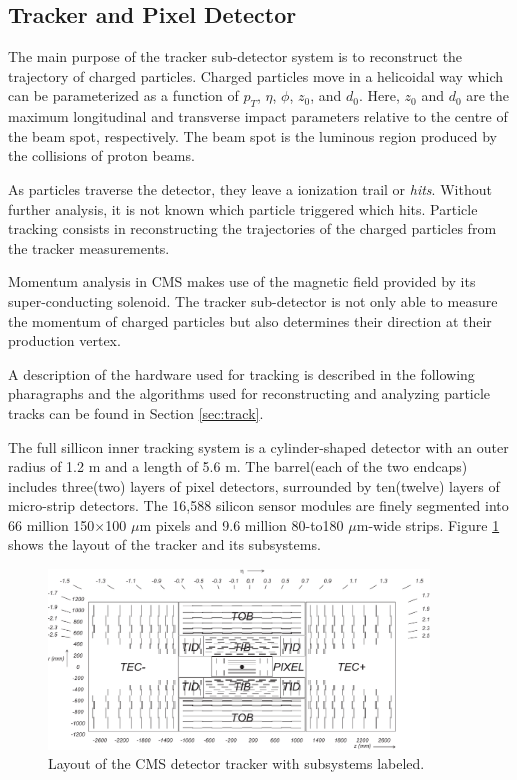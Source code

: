  \subsection{Tracker and Pixel Detector}
The main purpose of the tracker sub-detector system is to reconstruct the trajectory of charged particles. Charged particles move in a helicoidal way which can be parameterized as a function of $p_{T}$, $\eta$, $\phi$, $z_{0}$, and $d_{0}$. Here, $z_{0}$ and $d_{0}$ are the maximum longitudinal and transverse impact parameters relative to the centre of the beam spot, respectively. The beam spot is the luminous region produced by the collisions of proton beams.

As particles traverse the detector, they leave a ionization trail or \textit{hits}. Without further analysis, it is not known which particle triggered which hits. Particle tracking consists in reconstructing the trajectories of the charged particles from the tracker measurements. 

 Momentum analysis in CMS makes use of the magnetic field provided by its super-conducting solenoid. The tracker sub-detector is not only able to measure the momentum of charged particles but also determines their direction at their production vertex. 

 A description of the hardware used for tracking is described in the following pharagraphs and the algorithms used for reconstructing and analyzing particle tracks can be found in Section \ref{sec:track}.

 The full sillicon inner tracking system\cite{trackeradd} is a cylinder-shaped detector with an outer radius of 1.2 m and a length of 5.6 m. The barrel(each of the two endcaps) includes three(two) layers of pixel detectors, surrounded by ten(twelve) layers of micro-strip detectors. The 16,588 silicon sensor modules are finely segmented into 66 million 150$\times$100 $\mu$m pixels and 9.6 million 80-to180 $\mu$m-wide strips. Figure \ref{fig:cmstracker} shows the layout of the tracker and its subsystems.

   \begin{figure}[H]
 	\centering
 	\includegraphics[width=0.9\textwidth]{figures/CMS_tracker.pdf}
 	\singlespace
 	\caption{Layout of the CMS detector tracker with subsystems labeled.}
 	\label{fig:cmstracker}
 \end{figure}

